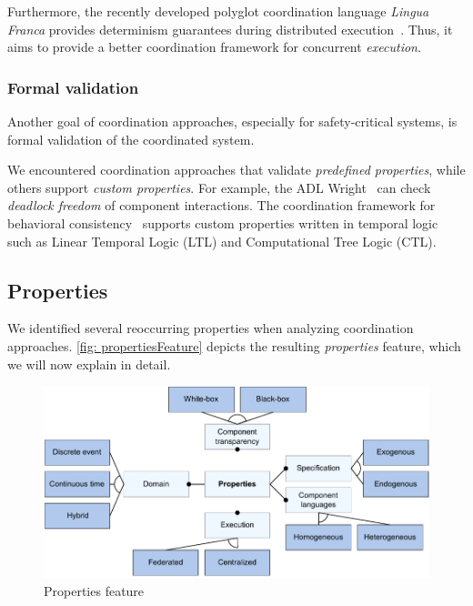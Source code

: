 \documentclass[runningheads]{llncs}
\begin{document}
Furthermore, the recently developed polyglot coordination language \textit{Lingua Franca} provides determinism guarantees during distributed execution~\cite{lohstrohLinguaFrancaDeterministic2021}.
Thus, it aims to provide a better coordination framework for concurrent \textit{execution}.


\subsubsection{Formal validation} Another goal of coordination approaches, especially for safety-critical systems, is formal validation of the coordinated system.

We encountered coordination approaches that validate \textit{predefined properties}, while others support \textit{custom properties}.
For example, the ADL Wright~\cite{allenFormalBasisArchitectural1997} can check \textit{deadlock freedom} of component interactions.
The coordination framework for behavioral consistency~\cite{krauterBehavioralConsistencyMultimodeling2023} supports custom properties written in temporal logic such as Linear Temporal Logic (LTL) and Computational Tree Logic (CTL).

\subsection{Properties}
We identified several reoccurring properties when analyzing coordination approaches.
\autoref{fig: propertiesFeature} depicts the resulting \textit{properties} feature, which we will now explain in detail.

\begin{figure}[ht]
	\centering
	\includegraphics[width=1\textwidth]{images/properties_feature}
	\caption{Properties feature}
	\label{fig: propertiesFeature}
\end{figure}
\end{document}
